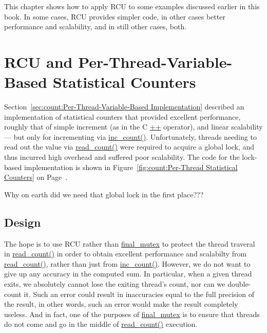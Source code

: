 

This chapter shows how to apply RCU to some examples discussed earlier
in this book.
In some cases, RCU provides simpler code, in other cases better
performance and scalability, and in still other cases, both.

\section{RCU and Per-Thread-Variable-Based Statistical Counters}
\label{sec:applyrcu:RCU and Per-Thread-Variable-Based Statistical Counters}

Section~\ref{sec:count:Per-Thread-Variable-Based Implementation}
described an implementation of statistical counters that provided
excellent
performance, roughly that of simple increment (as in the C \url{++}
operator), and linear scalability --- but only for incrementing
via \url{inc_count()}.
Unfortunately, threads needing to read out the value via \url{read_count()}
were required to acquire a global
lock, and thus incurred high overhead and suffered poor scalability.
The code for the lock-based implementation is shown in
Figure~\ref{fig:count:Per-Thread Statistical Counters} on
Page~\pageref{fig:count:Per-Thread Statistical Counters}.

\QuickQuiz{}
	Why on earth did we need that global lock in the first place???
 \QuickQuizEnd

\subsection{Design}

The hope is to use RCU rather than \url{final_mutex} to protect the
thread traveral in \url{read_count()} in order to obtain excellent
performance and scalabilty from \url{read_count()}, rather than just
from \url{inc_count()}.
However, we do not want to give up any accuracy in the computed sum.
In particular, when a given thread exits, we absolutely cannot
lose the exiting thread's count, nor can we double-count it.
Such an error could result in inaccuracies equal to the full
precision of the result, in other words, such an error would
make the result completely useless.
And in fact, one of the purposes of \url{final_mutex} is to
ensure that threads do not come and go in the middle of \url{read_count()}
execution.

